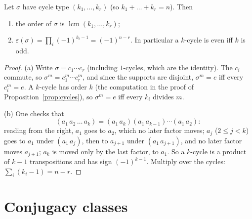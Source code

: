 \begin{corollary}\label{cor:ordersign}
Let $\sigma$ have cycle type $(k_1,\dots,k_r)$ (so $k_1+\dots+k_r=n$). Then
\begin{enumerate}[label=(\alph*)]
\item the order of $\sigma$ is $\operatorname{lcm}(k_1,\dots,k_r)$;
\item $\varepsilon(\sigma)=\prod_i(-1)^{k_i-1}=(-1)^{n-r}$. In particular a $k$-cycle is even iff $k$ is odd.
\end{enumerate}
\end{corollary}
\begin{proof}
(a) Write $\sigma=c_1\cdots c_r$ (including $1$-cycles, which are the identity). The $c_i$ commute, so $\sigma^m=c_1^m\cdots c_r^m$, and since the supports are disjoint, $\sigma^m=e$ iff every $c_i^m=e$. A $k$-cycle has order $k$ (the computation in the proof of Proposition~\ref{prop:cycles}), so $\sigma^m=e$ iff every $k_i$ divides $m$.

(b) One checks that
\[
(a_1\,a_2\,\dots\,a_k)=(a_1\,a_k)(a_1\,a_{k-1})\cdots(a_1\,a_2):
\]
reading from the right, $a_1$ goes to $a_2$, which no later factor moves; $a_j$ ($2\le j<k$) goes to $a_1$ under $(a_1\,a_j)$, then to $a_{j+1}$ under $(a_1\,a_{j+1})$, and no later factor moves $a_{j+1}$; $a_k$ is moved only by the last factor, to $a_1$. So a $k$-cycle is a product of $k-1$ transpositions and has sign $(-1)^{k-1}$. Multiply over the cycles: $\sum_i(k_i-1)=n-r$.
\end{proof}

\section{Conjugacy classes}

